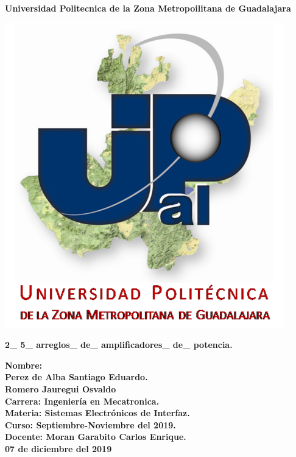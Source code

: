 \documentclass[14pt,letterpaper]{article}
\author{Perez de Alba Santiago Eduardo.}
\begin{document}
\begin{center}

\LARGE \textbf{Universidad Politecnica de la Zona Metropoilitana de Guadalajara\\}

\includegraphics[scale=1]{Upzmg.png} 

\large \textbf{2\_ 5\_ arreglos\_ de\_ amplificadores\_ de\_ potencia.}

\end{center}

\vspace{1cm} 
\large \textbf{Nombre: \\Perez de Alba Santiago Eduardo.\\ Romero Jauregui Osvaldo\\
\vspace{0.5cm} Carrera: Ingeniería en Mecatronica.\\
\vspace{0.5cm} Materia: Sistemas Electrónicos de Interfaz.\\
\vspace{0.5cm} Curso: Septiembre-Noviembre del 2019.\\
\vspace{0.5cm} Docente: Moran Garabito Carlos Enrique.}\\
\vspace{0.5cm}
\small \textbf{07 de diciembre del 2019}
\end{document}
